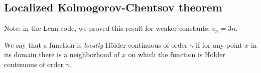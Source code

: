 








\subsection{Localized Kolmogorov-Chentsov theorem}




Note: in the Lean code, we proved this result for weaker constants: $c_n = 3n$.



We say that a function is \emph{locally} Hölder continuous of order $\gamma$ if for any point $x$ in its domain there is a neighborhood of $x$ on which the function is Hölder continuous of order $\gamma$.







